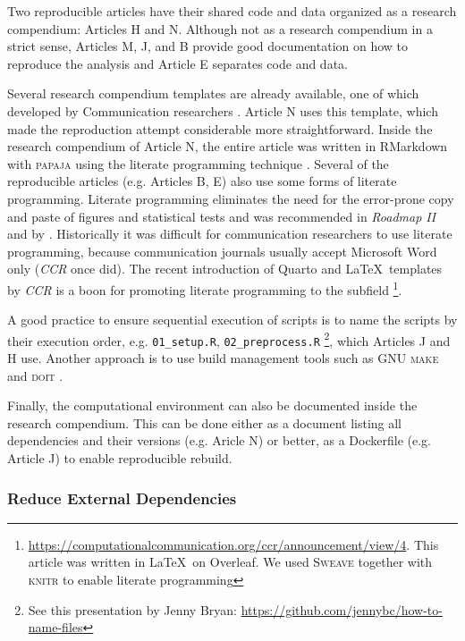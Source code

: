 Two reproducible articles have their shared code and data organized as a research compendium: Articles H and N. Although not as a research compendium in a strict sense, Articles M, J, and B provide good documentation on how to reproduce the analysis and Article E separates code and data.

Several research compendium templates are already available, one of which developed by Communication researchers \parencite[]{vanccs}. Article N uses this template, which made the reproduction attempt considerable more straightforward. Inside the research compendium of Article N, the entire article was written in RMarkdown with \textsc{papaja} \parencite[]{papajarpkg} using the literate programming technique \parencite[mixing of prose with programming code,][]{knuth:1984}. Several of the reproducible articles (e.g. Articles B, E) also use some forms of literate programming. Literate programming eliminates the need for the error-prone copy and paste of figures and statistical tests and was recommended in \textit{Roadmap II} and by \textcite{lewis:2019:OCS}. Historically it was difficult for communication researchers to use literate programming, because communication journals usually accept Microsoft Word only (\textit{CCR} once did). The recent introduction of Quarto and \LaTeX~templates by \textit{CCR} is a boon for promoting literate programming to the subfield \footnote{\url{https://computationalcommunication.org/ccr/announcement/view/4}. This article was written in \LaTeX~on Overleaf. We used \textsc{Sweave} \parencite[]{leisch2002sweave} together with \textsc{knitr} \parencite[]{knitrrpkg} to enable literate programming}.

A good practice to ensure sequential execution of scripts is to name the scripts by their execution order, e.g. \texttt{01\_setup.R}, \texttt{02\_preprocess.R} \footnote{See this presentation by Jenny Bryan: \url{https://github.com/jennybc/how-to-name-files}}, which Articles J and H use. Another approach is to use build management tools such as \textsc{GNU make} \parencite[][Article N uses this]{stallman1988gnu} and \textsc{doit} \parencite[][which the original compendium uses]{schettino:2021}.

Finally, the computational environment can also be documented inside the research compendium. This can be done either as a document listing all dependencies and their versions (e.g. Aricle N) or better, as a Dockerfile (e.g. Article J) to enable reproducible rebuild.

\subsubsection{Reduce External Dependencies}

